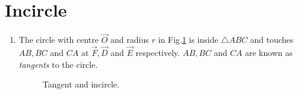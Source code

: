 \documentclass[journal,12pt,twocolumn]{IEEEtran}
\renewcommand\thesection{\arabic{section}}
\begin{document}
\section{Incircle}
\begin{enumerate}[label=\thesection.\arabic*
,ref=\thesection.\theenumi]
\item The circle with centre $\vec{O}$ and radius $r$ in Fig.\ref{fig:ang_bisect}	
 is inside 
$\triangle ABC$ and touches $AB, BC$ 
and $CA$ at $\vec{F}, \vec{D}$ and $\vec{E}$ respectively. $AB, BC$ and 
$CA$ are known as {\em tangents} to the circle.
\begin{figure}[!ht]
	\begin{center}
		
		\resizebox{\columnwidth}{!}{}
	\end{center}
	\caption{Tangent and incircle.}
	\label{fig:ang_bisect}	
\end{figure}



\end{enumerate}
\end{document}
